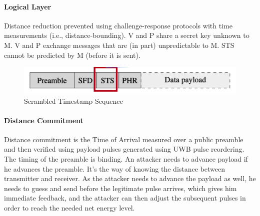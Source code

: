 \paragraph{Logical Layer}
Distance reduction prevented using challenge-response protocols with time measurements (i.e., distance-bounding). V and P share a secret key unknown to M. V and P exchange messages that are (in part) unpredictable to M. STS cannot be predicted by M (before it is sent).

\begin{figure}[h]
	\centering
	\includegraphics[scale=0.8]{images/5-sts.png}
	\caption{Scrambled Timestamp Sequence}%
	\label{fig:sts}
\end{figure}

\paragraph{Distance Commitment}
Distance commitment is the Time of Arrival measured over a public preamble and then verified using payload pulses generated using UWB pulse reordering. The timing of the preamble is binding. An attacker needs to advance payload if he advances the preamble. It's the way of knowing the distance between transmitter and receiver.
As the attacker needs to advance the payload as well, he needs to guess and send before the legitimate pulse arrives, which gives him immediate feedback, and the attacker can then adjust the subsequent pulses in order to reach the needed net energy level.


